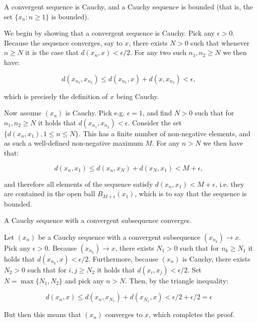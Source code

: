 \begin{exercise}{36}
    A convergent sequence is Cauchy, and a Cauchy sequence is bounded (that is, the set $\{x_n : n \geq 1\}$ is bounded).
\end{exercise}

\begin{solution}
    
    We begin by showing that a convergent sequence is Cauchy.
    Pick any $\epsilon > 0$.
    Because the sequence converges, say to $x$, there exists $N > 0$ such that whenever $n \geq N$ it is the case that $d(x_n, x) < \epsilon/2$.
    For any two such $n_1, n_2 \geq N$ we then have:
    
    $$d(x_{n_1}, x_{n_2}) \leq d(x_{n_1}, x) + d(x, x_{n_2}) < \epsilon,$$
    
    which is precisely the definition of $x$ being Cauchy.

    Now assume $(x_n)$ is Cauchy.
    Pick e.g. $\epsilon = 1$, and find $N > 0$ such that for $n_1, n_2 \geq N$ it holds that $d(x_{n_1}, x_{n_2}) < \epsilon$.
    Consider the set $\{d(x_n, x_1), 1 \leq n \leq N\}$.
    This has a finite number of non-negative elements, and as such a well-defined non-negative maximum $M$.
    For any $n > N$ we then have that:

    $$d(x_n, x_1) \leq d(x_n, x_N) + d(x_N, x_1) < M + \epsilon,$$

    and therefore all elements of the sequence satisfy $d(x_n, x_1) < M + \epsilon$, i.e. they are contained in the open ball $B_{M + \epsilon}(x_1)$, which is to say that the sequence is bounded.

\end{solution}

\begin{exercise}{37}
    A Cauchy sequence with a convergent subsequence converges.
\end{exercise}

\begin{solution}
    
    Let $(x_n)$ be a Cauchy sequence with a convergent subsequence $(x_{n_k}) \rightarrow x$.
    Pick any $\epsilon > 0$.
    Because $(x_{n_k}) \rightarrow x$, there exists $N_1 > 0$ such that for $n_k \geq N_1$ it holds that $d(x_{n_k}, x) < \epsilon/2$.
    Furthermore, because $(x_n)$ is Cauchy, there exists $N_2 > 0$ such that for $i, j \geq N_2$ it holds that $d(x_{i}, x_{j}) < \epsilon/2$.
    Set $N = \max\{N_1, N_2\}$ and pick any $n > N$.
    Then, by the triangle inequality:

    $$d(x_n, x) \leq d(x_n, x_{N_1}) + d(x_{N_1}, x) < \epsilon/2 + \epsilon/2 = \epsilon$$

    But then this means that $(x_n)$ converges to $x$, which completes the proof.
\end{solution}

